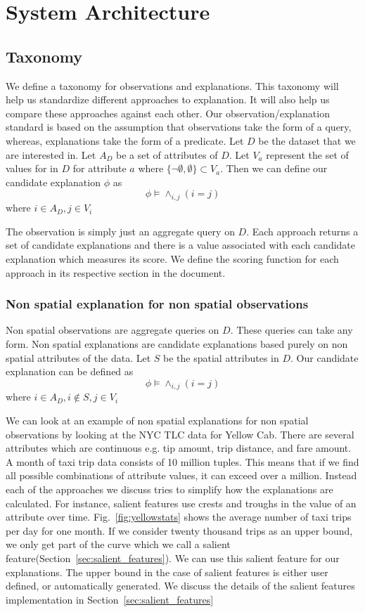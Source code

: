\chapter{System Architecture}
\label{chp:architecture}
\section{Taxonomy}
\label{sec:taxonomy}
We define a taxonomy for observations and explanations. This taxonomy will help us standardize different approaches to explanation. It will also help us compare these approaches against each other. Our observation/explanation standard is based on the assumption that observations take the form of a query, whereas, explanations take the form of a predicate. Let $D$ be the dataset that we are interested in. Let $A_D$ be a set of attributes of $D$. Let $V_a$ represent the set of values for in $D$ for attribute $a$ where $\{\neg \emptyset,\emptyset\} \subset V_a$. Then we can define our candidate explanation $\phi$ as $$\phi \models \wedge_{i,j} {(i=j)}$$ where $i \in A_D, j \in V_i $

The observation is simply just an aggregate query on $D$. Each approach returns a set of candidate explanations and there is a value associated with each candidate explanation which measures its score. We define the scoring function for each approach in its respective section in the document.

\subsection{Non spatial explanation for non spatial observations}
\label{sec:nonspatial_nonspatial}

Non spatial observations are aggregate queries on $D$. These queries can take any form. Non spatial explanations are candidate explanations based purely on non spatial attributes of the data. Let $S$ be the spatial attributes in $D$. Our candidate explanation can be defined as
$$\phi \models \wedge_{i,j} {(i=j)}$$
where $i \in A_D, i \notin S, j \in V_i$

We can look at an example of non spatial explanations for non spatial observations by looking at the NYC TLC data for Yellow Cab. There are several attributes which are continuous e.g. tip amount, trip distance, and fare amount. A month of taxi trip data consists of 10 million tuples. This means that if we find all possible combinations of attribute values, it can exceed over a million. Instead each of the approaches we discuss tries to simplify how the explanations are calculated. For instance, salient features use crests and troughs in the value of an attribute over time. Fig.~\ref{fig:yellowstats} shows the average number of taxi trips per day for one month. If we consider twenty thousand trips as an upper bound, we only get part of the curve which we call a salient feature(Section~\ref{sec:salient_features}). We can use this salient feature for our explanations. The upper bound in the case of salient features is either user defined, or automatically generated. We discuss the details of the salient features implementation in Section~\ref{sec:salient_features}


